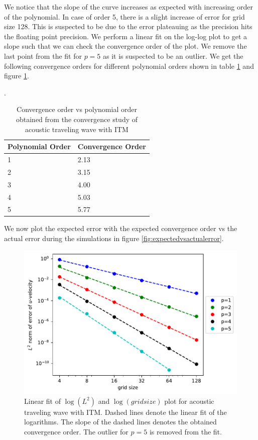 We notice that the slope of the curve increases as expected with increasing order of the polynomial. In case of order 5, there is a slight increase
of error for grid size 128. This is suspected to be due to the error plateauing as the precision hits the floating point precision. We perform a linear fit on the log-log
plot to get a slope such that we can check the convergence order of the plot. We remove the last point from the fit for $p=5$ as it is suspected to be an outlier. 
We get the following convergence orders for different polynomial orders shown in table \ref{table:convergenceorder} and figure \ref{fig:convergenceorder}.

\begin{center}
\begin{table}[htpb]
    \centering
    \caption{Convergence order vs polynomial order obtained from the convergence study of acoustic traveling wave with \ac{ITM}}.
    \label{table:convergenceorder}
    \begin{tabular}{|l|l|}
        \hline
     \textbf{Polynomial Order}& \textbf{Convergence Order}  \\
     \hline
     1 & 2.13\\
     \hline
     2 & 3.15 \\
     \hline
     3 & 4.00 \\
     \hline
     4 & 5.03 \\
        \hline
        5 & 5.77\\
        \hline
    \end{tabular}
    \end{table}
\end{center}
We now plot the expected error with the expected convergence order vs the actual error during the simulations in figure \ref{fig:expectedvsactualerror}.
\begin{figure}[htpb]
    \centering
    \includegraphics[width=0.75\linewidth]{figures/error2.pdf}
    \caption{Linear fit of $\log\left(L^2\right)$ and $\log\left(grid size\right)$  plot for acoustic traveling wave with \ac{ITM}. Dashed lines denote the linear fit of the logarithms. The slope of the dashed lines denotes the obtained convergence order. The outlier for $p=5$ is removed from the fit.}
    \label{fig:convergenceorder}
\end{figure}
